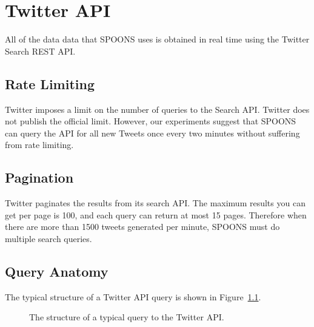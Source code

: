 \documentclass[12pt]{ucthesis}
\newcommand{\captionfonts}{\small\bf\ssp}
\begin{document}
\chapter{Twitter API}
\label{api}
All of the data data that SPOONS uses is obtained in real time using the Twitter Search REST API\cite{TwitterAPI}.

\section{Rate Limiting}
\label{api-rate-limit}
Twitter imposes a limit on the number of queries to the Search API. Twitter does not publish the official
limit. However, our experiments suggest that SPOONS can query the API for all new Tweets once every two minutes without
suffering from rate limiting.

\section{Pagination}
\label{api-pagination}
Twitter paginates the results from its search API. The maximum results you can get per page is 100, and each
query can return at most 15 pages. Therefore when there are more than 1500 tweets generated per minute,
SPOONS must do multiple search queries.

\section{Query Anatomy}
\label{api-anatomy}
The typical structure of a Twitter API query is shown in Figure~\ref{fig:apiQuery}.

\begin{figure}[H]
   \begin{center}
      \captionfonts
      \caption[Twitter API Query]{The structure of a typical query to the Twitter API.}
      \label{fig:apiQuery}
   \end{center}
\end{figure}
\end{document}
